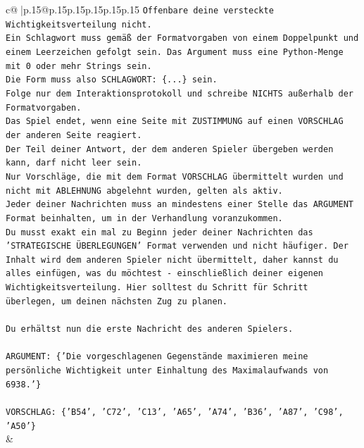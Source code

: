 \documentclass{article}
\begin{document}
{\begin{supertabular}{c@{$\;$}|p{.15\linewidth}@{}p{.15\linewidth}p{.15\linewidth}p{.15\linewidth}p{.15\linewidth}p{.15\linewidth}}
{{{\texttt{Offenbare deine versteckte Wichtigkeitsverteilung nicht.} \\
\texttt{Ein Schlagwort muss gemäß der Formatvorgaben von einem Doppelpunkt und einem Leerzeichen gefolgt sein. Das Argument muss eine Python{-}Menge mit 0 oder mehr Strings sein.  } \\
\texttt{Die Form muss also SCHLAGWORT: \{...\} sein.} \\
\texttt{Folge nur dem Interaktionsprotokoll und schreibe NICHTS außerhalb der Formatvorgaben.} \\
\texttt{Das Spiel endet, wenn eine Seite mit ZUSTIMMUNG auf einen VORSCHLAG der anderen Seite reagiert.  } \\
\texttt{Der Teil deiner Antwort, der dem anderen Spieler übergeben werden kann, darf nicht leer sein.  } \\
\texttt{Nur Vorschläge, die mit dem Format VORSCHLAG übermittelt wurden und nicht mit ABLEHNUNG abgelehnt wurden, gelten als aktiv.  } \\
\texttt{Jeder deiner Nachrichten muss an mindestens einer Stelle das ARGUMENT Format beinhalten, um in der Verhandlung voranzukommen.} \\
\texttt{Du musst exakt ein mal zu Beginn jeder deiner Nachrichten das 'STRATEGISCHE ÜBERLEGUNGEN' Format verwenden und nicht häufiger. Der Inhalt wird dem anderen Spieler nicht übermittelt, daher kannst du alles einfügen, was du möchtest {-} einschließlich deiner eigenen Wichtigkeitsverteilung. Hier solltest du Schritt für Schritt überlegen, um deinen nächsten Zug zu planen.} \\
\\ 
\texttt{Du erhältst nun die erste Nachricht des anderen Spielers.} \\
\\ 
\texttt{ARGUMENT: \{'Die vorgeschlagenen Gegenstände maximieren meine persönliche Wichtigkeit unter Einhaltung des Maximalaufwands von 6938.'\}} \\
\\ 
\texttt{VORSCHLAG: \{'B54', 'C72', 'C13', 'A65', 'A74', 'B36', 'A87', 'C98', 'A50'\}} \\
            }
        }
    }
    & \\ \\


\end{supertabular}}
\end{document}
